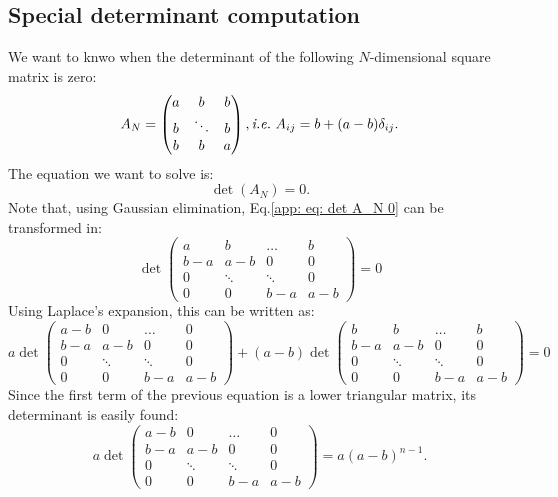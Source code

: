 \documentclass[12pt]{report}
\begin{document}
\subsection{Special determinant computation}\label{app : special determinant computation}
We want to knwo when the determinant of the following $N$-dimensional square matrix is zero:
\begin{equation}
A_N = \begin{pmatrix}
a & b & b  \\
b & \ddots & b  \\
b & b & a
\end{pmatrix}, \textit{i.e.} \ A_{ij} = b+(a-b)\delta_{ij}.
\end{equation}
The equation we want to solve is:
\begin{equation}
\det\left(A_N\right)=0. \label{app: eq: det A_N 0}
\end{equation}
Note that, using Gaussian elimination, Eq.\eqref{app: eq: det A_N 0} can be transformed in:
\begin{equation}
\det\begin{pmatrix}
a & b & \dots & b \\
b-a & a-b & 0 & 0 \\
0 & \ddots & \ddots & 0 \\
0 & 0 & b-a & a-b
\end{pmatrix}=0
\end{equation}
Using Laplace's expansion, this can be written as:
\begin{equation}
 a \det\begin{pmatrix}
a-b & 0 & \dots & 0 \\
b-a & a-b & 0 & 0 \\
0 & \ddots & \ddots & 0 \\
0 & 0 & b-a & a-b
\end{pmatrix}+(a-b)
\det\begin{pmatrix}
b & b & \dots & b \\
b-a & a-b & 0 & 0 \\
0 & \ddots & \ddots & 0 \\
0 & 0 & b-a & a-b
\end{pmatrix}=0 \label{app: eq: laplace expansion}
\end{equation}
Since the first term of the previous equation is a lower triangular matrix, its determinant is easily found:
\begin{equation}
a \det\begin{pmatrix}
a-b & 0 & \dots & 0 \\
b-a & a-b & 0 & 0 \\
0 & \ddots & \ddots & 0 \\
0 & 0 & b-a & a-b
\end{pmatrix} = a\left(a-b\right)^{n-1}.
\end{equation}
\end{document}
